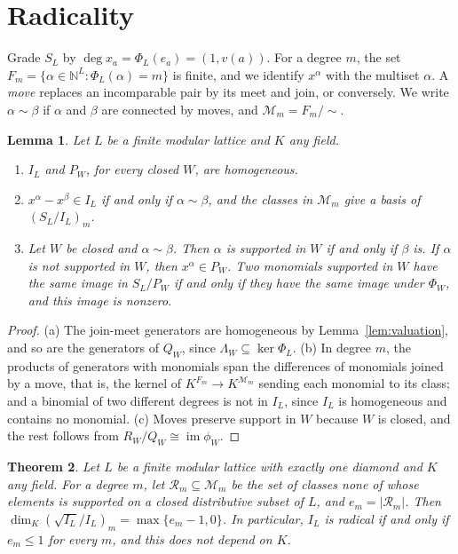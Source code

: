 \documentclass{amsart}
\newtheorem{theorem}{Theorem}[section]
\newtheorem{lemma}[theorem]{Lemma}
\theoremstyle{definition}
\newcommand{\N}{\mathbb N}
\begin{document}
\section{Radicality}\label{sec:radical}

Grade $S_L$ by $\deg x_a=\Phi_L(e_a)=(1,v(a))$. For a degree $m$, the set $F_m=\{\alpha\in\N^L:\Phi_L(\alpha)=m\}$ is finite, and we identify $x^\alpha$ with the multiset $\alpha$. A \emph{move} replaces an incomparable pair by its meet and join, or conversely. We write $\alpha\sim\beta$ if $\alpha$ and $\beta$ are connected by moves, and $\mathcal M_m=F_m/{\sim}$.

\begin{lemma}\label{lem:moves}
Let $L$ be a finite modular lattice and $K$ any field.
\begin{enumerate}
\item[(a)] $I_L$ and $P_W$, for every closed $W$, are homogeneous.
\item[(b)] $x^\alpha-x^\beta\in I_L$ if and only if $\alpha\sim\beta$, and the classes in $\mathcal M_m$ give a basis of $(S_L/I_L)_m$.
\item[(c)] Let $W$ be closed and $\alpha\sim\beta$. Then $\alpha$ is supported in $W$ if and only if $\beta$ is. If $\alpha$ is not supported in $W$, then $x^\alpha\in P_W$. Two monomials supported in $W$ have the same image in $S_L/P_W$ if and only if they have the same image under $\Phi_W$, and this image is nonzero.
\end{enumerate}
\end{lemma}

\begin{proof}
(a) The join-meet generators are homogeneous by Lemma~\ref{lem:valuation}, and so are the generators of $Q_W$, since $\Lambda_W\subseteq\ker\Phi_L$. (b) In degree $m$, the products of generators with monomials span the differences of monomials joined by a move, that is, the kernel of $K^{F_m}\to K^{\mathcal M_m}$ sending each monomial to its class; and a binomial of two different degrees is not in $I_L$, since $I_L$ is homogeneous and contains no monomial. (c) Moves preserve support in $W$ because $W$ is closed, and the rest follows from $R_W/Q_W\cong\operatorname{im}\phi_W$.
\end{proof}

\begin{theorem}\label{thm:radcrit}
Let $L$ be a finite modular lattice with exactly one diamond and $K$ any field. For a degree $m$, let $\mathcal R_m\subseteq\mathcal M_m$ be the set of classes none of whose elements is supported on a closed distributive subset of $L$, and $e_m=|\mathcal R_m|$. Then $\dim_K(\sqrt{I_L}/I_L)_m=\max\{e_m-1,0\}$. In particular, $I_L$ is radical if and only if $e_m\le1$ for every $m$, and this does not depend on $K$.
\end{theorem}
\end{document}
